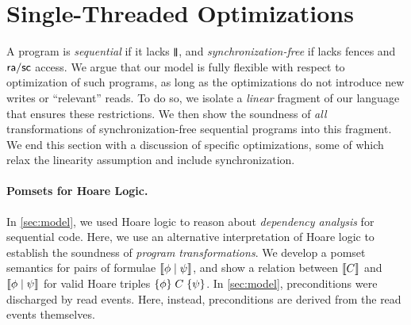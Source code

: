 \section{Single-Threaded Optimizations}
\label{sec:opt}

A program is \emph{sequential} if it lacks $\!\!\,\mathbin{\texttt{\textbf{|}}\mkern-6mu\texttt{\textbf{|}}}\,\!\!$, and
\emph{synchronization-free} if lacks fences and ${\mathsf{ra}}/{\mathsf{sc}}$ access.
We argue that our model is fully flexible with respect to 
optimization of such programs, as long as the
optimizations do not introduce new writes or ``relevant'' reads.  To do so, we
 isolate a \emph{linear} fragment of our language that ensures these
restrictions.  We then show the soundness of {\em all} transformations of
synchronization-free sequential programs into this fragment.  
%
We end this section with a discussion of specific optimizations, some of
which relax the linearity assumption and include synchronization.

\paragraph{Pomsets for Hoare Logic.}
In \textsection\ref{sec:model}, we used Hoare logic
\cite{Hoare:1969:ABC:363235.363259,gordonHoare} to reason about
\emph{dependency analysis} for sequential code.  Here, we use an alternative
interpretation of Hoare logic to establish the soundness of \emph{program
  transformations}.  We develop a pomset semantics for pairs of formulae
$\llbracket\phi\mid\psi\rrbracket$, and show a relation between $\llbracket C\rrbracket$ and
$\llbracket\phi\mid\psi\rrbracket$ for valid Hoare triples
$\{\phi\}\allowbreak\;C\;\allowbreak\{\psi\}$.  In \textsection\ref{sec:model},
preconditions were discharged by read events.  Here, instead, preconditions
are derived from the read events themselves.

